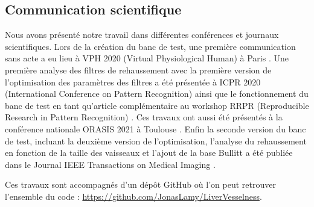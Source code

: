 \subsection{Communication scientifique}
Nous avons présenté notre travail dans différentes conférences et journaux scientifiques. Lors de la création du banc de test, une première communication sans acte a eu lieu à VPH 2020 (Virtual Physiological Human) à Paris \cite{Lamy2020_VPH_bench}. Une première analyse des filtres de rehaussement avec la première version de l'optimisation des paramètres des filtres a été présentée à ICPR 2020 (International Conference on Pattern Recognition) \cite{Lamy2020_ICPR} ainsi que le fonctionnement du banc de test en tant qu'article complémentaire au workshop RRPR (Reproducible Research in Pattern Recognition) \cite{Lamy2021_RRPR}. Ces travaux ont aussi été présentés à la  conférence nationale ORASIS 2021 à Toulouse \cite{Lamy2021_ORASIS}. Enfin la seconde version du banc de test, incluant la deuxième version de l'optimisation, l'analyse du rehaussement en fonction de la taille des vaisseaux et l'ajout de la base Bullitt a été publiée dans le Journal IEEE Transactions on Medical Imaging \cite{Lamy2022_TMI}.

Ces travaux sont accompagnés d'un dépôt GitHub où l'on peut retrouver l'ensemble du code : \url{https://github.com/JonasLamy/LiverVesselness}. 
